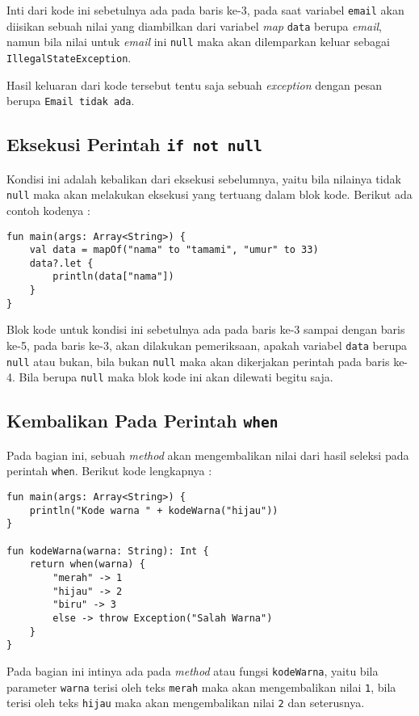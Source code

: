 Inti dari kode ini sebetulnya ada pada baris ke-3, pada saat variabel \texttt{email} akan diisikan sebuah nilai yang diambilkan dari variabel \textit{map} \texttt{data} berupa \textit{email}, namun bila nilai untuk \textit{email} ini \texttt{null} maka akan dilemparkan keluar sebagai \texttt{IllegalStateException}.

Hasil keluaran dari kode tersebut tentu saja sebuah \textit{exception} dengan pesan berupa \texttt{Email tidak ada}.

\subsection{Eksekusi Perintah \texttt{if not null}}

Kondisi ini adalah kebalikan dari eksekusi sebelumnya, yaitu bila nilainya tidak \texttt{null} maka akan melakukan eksekusi yang tertuang dalam blok kode. Berikut ada contoh kodenya :

\begin{lstlisting}
fun main(args: Array<String>) {
	val data = mapOf("nama" to "tamami", "umur" to 33)
	data?.let {
		println(data["nama"])
	}
}
\end{lstlisting}

Blok kode untuk kondisi ini sebetulnya ada pada baris ke-3 sampai dengan baris ke-5, pada baris ke-3, akan dilakukan pemeriksaan, apakah variabel \texttt{data} berupa \texttt{null} atau bukan, bila bukan \texttt{null} maka akan dikerjakan perintah pada baris ke-4. Bila berupa \texttt{null} maka blok kode ini akan dilewati begitu saja.

\subsection{Kembalikan Pada Perintah \texttt{when}}

Pada bagian ini, sebuah \textit{method} akan mengembalikan nilai dari hasil seleksi pada perintah \texttt{when}. Berikut kode lengkapnya :

\begin{lstlisting}
fun main(args: Array<String>) {
	println("Kode warna " + kodeWarna("hijau"))
}

fun kodeWarna(warna: String): Int {
	return when(warna) {
		"merah" -> 1
		"hijau" -> 2
		"biru" -> 3
		else -> throw Exception("Salah Warna")
	}
}
\end{lstlisting}

Pada bagian ini intinya ada pada \textit{method} atau fungsi \texttt{kodeWarna}, yaitu bila parameter \texttt{warna} terisi oleh teks \texttt{merah} maka akan mengembalikan nilai \texttt{1}, bila terisi oleh teks \texttt{hijau} maka akan mengembalikan nilai \texttt{2} dan seterusnya.

